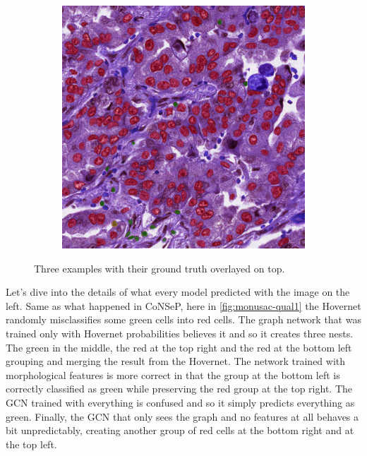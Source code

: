\begin{figure}[H]
\begin{subfigure}[b]{0.3\textwidth}
    \label{fig:monusac-gt2}
  \end{subfigure}
  \begin{subfigure}[b]{0.3\textwidth}
    \includegraphics[width=\textwidth]{imgs/qual/monusac/gt3.overlay.png}
    \label{fig:monusac-gt3}
  \end{subfigure}
    \caption{Three examples with their ground truth overlayed on top.}
    \label{fig:monusac-ex}
\end{figure}

Let's dive into the details of what every model predicted with the image on the left. Same as what happened in CoNSeP, here in \autoref{fig:monusac-qual1} the Hovernet randomly misclassifies some green cells into red cells. The graph network that was trained only with Hovernet probabilities believes it and so it creates three nests. The green in the middle, the red at the top right and the red at the bottom left grouping and merging the result from the Hovernet. The network trained with morphological features is more correct in that the group at the bottom left is correctly classified as green while preserving the red group at the top right. The GCN trained with everything is confused and so it simply predicts everything as green. Finally, the GCN that only sees the graph and no features at all behaves a bit unpredictably, creating another group of red cells at the bottom right and at the top left.

